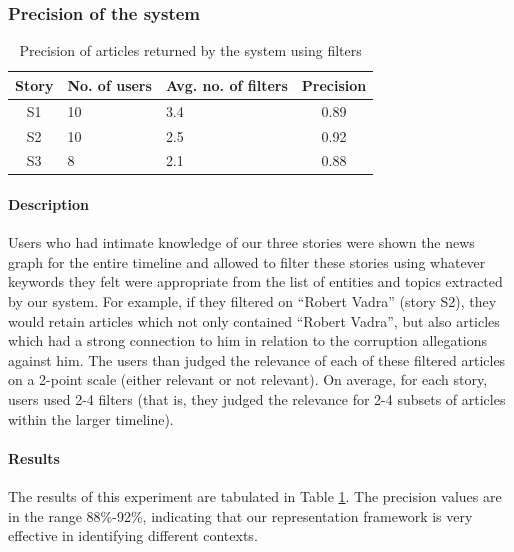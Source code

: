 \subsubsection{Precision of the system}

\begin{table}
\begin{center}
\small
\begin{tabular}{|c|p{1.25cm}|p{1.25cm}|c|}
\hline
{\bf Story} & {\bf No. of users} & {\bf Avg. no. of filters} & {\bf Precision}\\
\hline
S1 & 10 & 3.4 & 0.89\\
S2 & 10 & 2.5 & 0.92\\
S3 & 8 & 2.1 & 0.88\\
\hline
\end{tabular}
\end{center}
\caption{Precision of articles returned by the system using filters}
\label{tab:prec}
\end{table}

\normalsize

\paragraph*{Description} Users who had intimate knowledge of our three stories were shown the news graph for the entire timeline and allowed to filter these stories using whatever keywords they felt were appropriate from the list of entities and topics extracted by our system. For example, if they filtered on ``Robert Vadra'' (story S2), they would retain articles which not only contained ``Robert Vadra'', but also articles which had a strong connection to him in relation to the corruption allegations against him. The users than judged the relevance of each of these filtered articles on a 2-point scale (either relevant or not relevant). On average, for each story, users used 2-4 filters (that is, they judged the relevance for 2-4 subsets of articles within the larger timeline).

\paragraph*{Results} The results of this experiment are tabulated in Table \ref{tab:prec}. The precision values are in the range 88\%-92\%, indicating that our representation framework is very effective in identifying different contexts.

